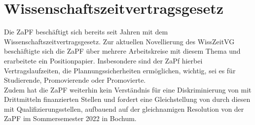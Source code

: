 \documentclass{scrartcl}
\begin{document}
	\section*{Wissenschaftszeitvertragsgesetz}
	Die ZaPF beschäftigt sich bereits seit Jahren mit dem Wissenschaftszeitvertragsgesetz. 
	Zur aktuellen Novellierung des WissZeitVG beschäftigte sich die ZaPF über mehrere Arbeitskreise mit diesem Thema und erarbeitete ein Positionpapier. Insbesondere sind der ZaPf hierbei Vertragslaufzeiten, die Plannungssicherheiten ermöglichen, wichtig, sei es für Studierende, Promovierende oder Promovierte.\\
	Zudem hat die ZaPF weiterhin kein Verständnis für eine Diskriminierung von mit Drittmitteln finanzierten Stellen und fordert eine Gleichstellung von durch diesen mit Qualifizierungsstellen, aufbauend auf der gleichnamigen Resolution von der ZaPF im Sommersemester 2022 in Bochum.
	
\end{document}
